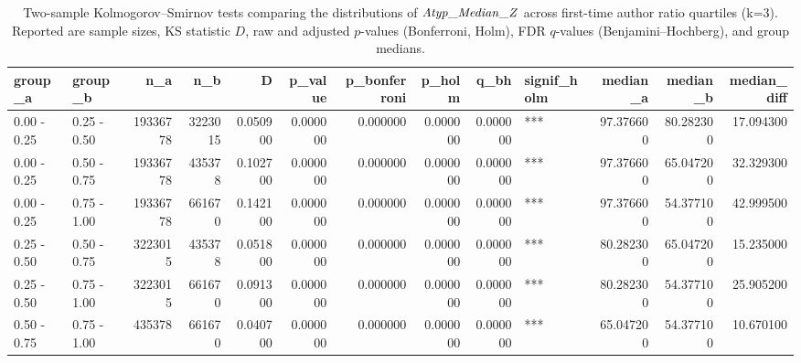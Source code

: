 \begin{table}
\caption{Two-sample Kolmogorov–Smirnov tests comparing the distributions of $\it{Atyp\_Median\_Z}$ across first-time author ratio quartiles (k=3). Reported are sample sizes, KS statistic $D$, raw and adjusted $p$-values (Bonferroni, Holm), FDR $q$-values (Benjamini–Hochberg), and group medians.}
\label{tab:ks_atyp_median_k3}
\begin{tabular}{llrrrrrrrlrrr}
\toprule
group\_a & group\_b & n\_a & n\_b & D & p\_value & p\_bonferroni & p\_holm & q\_bh & signif\_holm & median\_a & median\_b & median\_diff \\
\midrule
0.00 - 0.25 & 0.25 - 0.50 & 19336778 & 3223015 & 0.050900 & 0.000000 & 0.000000 & 0.000000 & 0.000000 & *** & 97.376600 & 80.282300 & 17.094300 \\
0.00 - 0.25 & 0.50 - 0.75 & 19336778 & 435378 & 0.102700 & 0.000000 & 0.000000 & 0.000000 & 0.000000 & *** & 97.376600 & 65.047200 & 32.329300 \\
0.00 - 0.25 & 0.75 - 1.00 & 19336778 & 661670 & 0.142100 & 0.000000 & 0.000000 & 0.000000 & 0.000000 & *** & 97.376600 & 54.377100 & 42.999500 \\
0.25 - 0.50 & 0.50 - 0.75 & 3223015 & 435378 & 0.051800 & 0.000000 & 0.000000 & 0.000000 & 0.000000 & *** & 80.282300 & 65.047200 & 15.235000 \\
0.25 - 0.50 & 0.75 - 1.00 & 3223015 & 661670 & 0.091300 & 0.000000 & 0.000000 & 0.000000 & 0.000000 & *** & 80.282300 & 54.377100 & 25.905200 \\
0.50 - 0.75 & 0.75 - 1.00 & 435378 & 661670 & 0.040700 & 0.000000 & 0.000000 & 0.000000 & 0.000000 & *** & 65.047200 & 54.377100 & 10.670100 \\
\bottomrule
\end{tabular}
\end{table}
